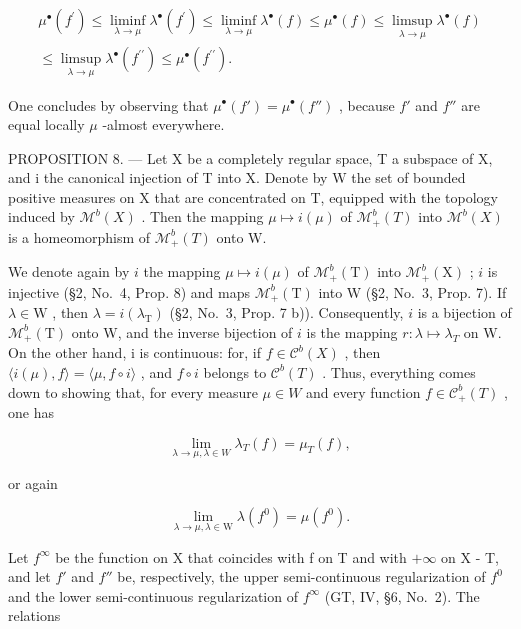 \[
\begin{array}{c} \mu^ {\bullet} (f ^ {\prime}) \leqslant \liminf _ {\lambda \to \mu} \lambda^ {\bullet} (f ^ {\prime}) \leqslant \liminf _ {\lambda \to \mu} \lambda^ {\bullet} (f) \leqslant \mu^ {\bullet} (f) \leqslant \limsup _ {\lambda \to \mu} \lambda^ {\bullet} (f) \\ \leqslant \limsup _ {\lambda \to \mu} \lambda^ {\bullet} (f ^ {\prime \prime}) \leqslant \mu^ {\bullet} (f ^ {\prime \prime}). \end{array}
\]

One concludes by observing that \(\mu^{\bullet}(f') = \mu^{\bullet}(f'')\) , because \(f'\) and \(f''\) are equal locally \(\mu\) -almost everywhere.

PROPOSITION 8. --- Let X be a completely regular space, T a subspace of X, and i the canonical injection of T into X. Denote by W the set of bounded positive measures on X that are concentrated on T, equipped with the topology induced by \(\mathcal{M}^{b}(X)\) . Then the mapping \(\mu \mapsto i(\mu)\) of \(\mathcal{M}_{+}^{b}(T)\) into \(\mathcal{M}^{b}(X)\) is a homeomorphism of \(\mathcal{M}_{+}^{b}(T)\) onto W.

We denote again by \(i\) the mapping \(\mu \mapsto i(\mu)\) of \(\mathcal{M}_{+}^{b}(\mathrm{T})\) into \(\mathcal{M}_{+}^{b}(\mathrm{X})\) ; \(i\) is injective (§2, No.~4, Prop. 8) and maps \(\mathcal{M}_{+}^{b}(\mathrm{T})\) into W (§2, No.~3, Prop. 7). If \(\lambda \in \mathrm{W}\) , then \(\lambda = i(\lambda_{\mathrm{T}})\) (§2, No.~3, Prop. 7 b)). Consequently, \(i\) is a bijection of \(\mathcal{M}_{+}^{b}(\mathrm{T})\) onto W, and the inverse bijection of \(i\) is the mapping \(r : \lambda \mapsto \lambda_{T}\) on W. On the other hand, i is continuous: for, if \(f \in \mathcal{C}^{b}(X)\) , then \(\langle i(\mu), f \rangle = \langle \mu, f \circ i \rangle\) , and \(f \circ i\) belongs to \(\mathcal{C}^{b}(T)\) . Thus, everything comes down to showing that, for every measure \(\mu \in W\) and every function \(f \in \mathcal{C}_{+}^{b}(T)\) , one has

\[
\lim _ {\lambda \to \mu , \lambda \in W} \lambda_ {T} (f) = \mu_ {T} (f),
\]

or again

\[
\lim _ {\lambda \to \mu ,   \lambda \in \mathrm{W}} \lambda (f ^ {0}) = \mu (f ^ {0}).
\]

Let \(f^{\infty}\) be the function on X that coincides with f on T and with \(+\infty\) on X - T, and let \(f'\) and \(f''\) be, respectively, the upper semi-continuous regularization of \(f^{0}\) and the lower semi-continuous regularization of \(f^{\infty}\) (GT, IV, §6, No.~2). The relations

